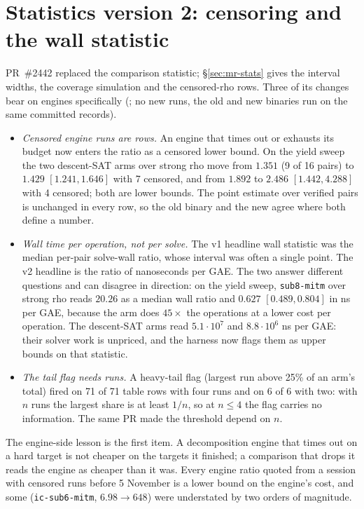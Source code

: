 \section{Statistics version 2: censoring and the wall statistic}\label{sec:em-stats}

PR~\#2442 replaced the comparison statistic; \S\ref{sec:mr-stats} gives the
interval widths, the coverage simulation and the censored-rho rows. Three
of its changes bear on engines specifically
(; no new runs, the
old and new binaries run on the same committed records).
\begin{itemize}
\item \emph{Censored engine runs are rows.} An engine that times out or
  exhausts its budget now enters the ratio as a censored lower bound. On
  the yield sweep the two descent-SAT arms over strong rho move from
  $1.351$ (9 of 16 pairs) to $1.429$ $[1.241,1.646]$ with 7 censored, and
  from $1.892$ to $2.486$ $[1.442,4.288]$ with 4 censored; both are lower
  bounds. The point estimate over verified pairs is unchanged in every
  row, so the old binary and the new agree where both define a number.
\item \emph{Wall time per operation, not per solve.} The v1 headline wall
  statistic was the median per-pair solve-wall ratio, whose interval was
  often a single point. The v2 headline is the ratio of nanoseconds per
  GAE. The two answer different questions and can disagree in direction:
  on the yield sweep, \texttt{sub8-mitm} over strong rho reads $20.26$ as a
  median wall ratio and $0.627$ $[0.489,0.804]$ in ns per GAE, because the
  arm does $45\times$ the operations at a lower cost per operation. The
  descent-SAT arms read $5.1\cdot10^7$ and $8.8\cdot10^6$ ns per GAE: their
  solver work is unpriced, and the harness now flags them as upper bounds
  on that statistic.
\item \emph{The tail flag needs runs.} A heavy-tail flag (largest run
  above 25\% of an arm's total) fired on 71 of 71 table rows with four runs
  and on 6 of 6 with two: with $n$ runs the largest share is at least
  $1/n$, so at $n\le4$ the flag carries no information. The same PR made
  the threshold depend on $n$.
\end{itemize}
The engine-side lesson is the first item. A decomposition engine that
times out on a hard target is not cheaper on the targets it finished; a
comparison that drops it reads the engine as cheaper than it was. Every
engine ratio quoted from a session with censored runs before 5 November is
a lower bound on the engine's cost, and some (\texttt{ic-sub6-mitm}, $6.98\to
648$) were understated by two orders of magnitude.

